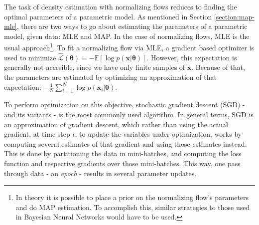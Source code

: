The task of density estimation with normalizing flows reduces to finding the
optimal parameters of a parametric model. As mentioned in Section \ref{section:map-mle},
there are two ways to go about estimating the parameters of a parametric model,
given data: MLE and MAP. In the case of normalizing flows, MLE is the usual
approach\footnote{In theory it is possible to place a prior on the normalizing
flow's parameters and do MAP estimation. To accomplish this, similar strategies
to those used in Bayesian Neural Networks would have to be used.}. To fit a normalizing
flow via MLE, a gradient based optimizer is used to minimize
$\hat{\mathcal{L}}(\bm\theta) = - \mathbb{E}[\log p(\bm{x}|\bm\theta)]$.
However, this expectation is generally not accesible, since we have only
finite samples of $\bm{x}$. Because of that, the parameters are estimated
by optimizing an approximation of that expectation: $ - \frac{1}{N} \sum_{i=1}^N \log p(\bm{x_i} | \bm\theta)$.

To perform optimization on this objective, stochastic gradient descent (SGD) - and
its variants -  is the most commonly used algorithm. In general terms, SGD is an
approximation of gradient descent, which rather than using the actual gradient,
at time step $t$, to update the variables under optimization, works by computing
several estimates of that gradient and using those estimates instead. This is
done by partitioning the data in mini-batches, and computing the loss function
and respective gradients over those mini-batches. This way, one pass through
data - an \emph{epoch} - results in several parameter updates.
